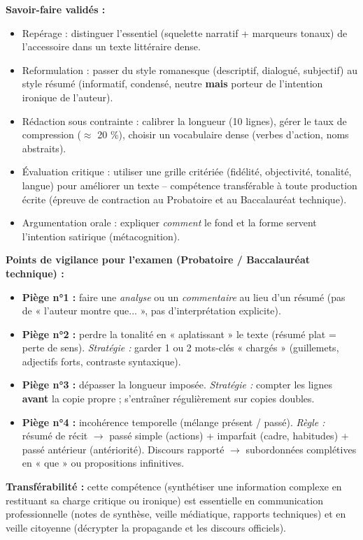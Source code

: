 \documentclass[11pt]{article}
\newcommand{\cle}[1]{{\popxbold\color{popdark}#1}}
\newcounter{popsec}
\newcounter{popsub}
\newcommand{\courssub}[1]{%
  \stepcounter{popsub}%
  \par\vspace{9pt}\noindent{\popxbold\fontsize{11.5}{13}\selectfont\color{popink}{\color{poporange}\thepopsec.\thepopsub}\hspace{6pt}#1}\par\nopagebreak\vspace{4pt}
}
\begin{document}
\courssub{Bilan de l'activité}
\begin{aretenir}
\textbf{Savoir-faire validés :}
\begin{itemize}
    \item \cle{Repérage} : distinguer l'essentiel (squelette narratif + marqueurs tonaux) de l'accessoire dans un texte littéraire dense.
    \item \cle{Reformulation} : passer du style romanesque (descriptif, dialogué, subjectif) au style résumé (informatif, condensé, neutre \textbf{mais} porteur de l'intention ironique de l'auteur).
    \item \cle{Rédaction sous contrainte} : calibrer la longueur (10 lignes), gérer le taux de compression ($\approx$ 20 \%), choisir un vocabulaire dense (verbes d'action, noms abstraits).
    \item \cle{Évaluation critique} : utiliser une grille critériée (fidélité, objectivité, tonalité, langue) pour améliorer un texte -- compétence transférable à toute production écrite (épreuve de contraction au Probatoire et au Baccalauréat technique).
    \item \cle{Argumentation orale} : expliquer \emph{comment} le fond et la forme servent l'intention satirique (métacognition).
\end{itemize}

\textbf{Points de vigilance pour l'examen (Probatoire / Baccalauréat technique) :}
\begin{itemize}
    \item \textbf{Piège n°1 :} faire une \emph{analyse} ou un \emph{commentaire} au lieu d'un résumé (pas de « l'auteur montre que... », pas d'interprétation explicite).
    \item \textbf{Piège n°2 :} perdre la tonalité en « aplatissant » le texte (résumé plat = perte de sens). \emph{Stratégie :} garder 1 ou 2 mots-clés « chargés » (guillemets, adjectifs forts, contraste syntaxique).
    \item \textbf{Piège n°3 :} dépasser la longueur imposée. \emph{Stratégie :} compter les lignes \textbf{avant} la copie propre ; s'entraîner régulièrement sur copies doubles.
    \item \textbf{Piège n°4 :} incohérence temporelle (mélange présent / passé). \emph{Règle :} résumé de récit $\rightarrow$ passé simple (actions) + imparfait (cadre, habitudes) + passé antérieur (antériorité). Discours rapporté $\rightarrow$ subordonnées complétives en « que » ou propositions infinitives.
\end{itemize}

\textbf{Transférabilité :} cette compétence (synthétiser une information complexe en restituant sa charge critique ou ironique) est essentielle en \cle{communication professionnelle} (notes de synthèse, veille médiatique, rapports techniques) et en \cle{veille citoyenne} (décrypter la propagande et les discours officiels).
\end{aretenir}
\end{document}
